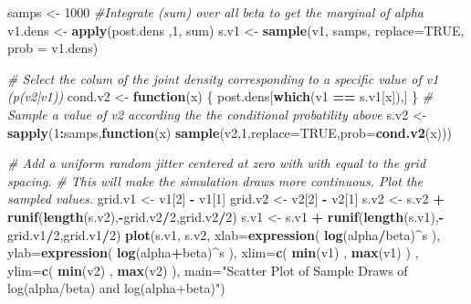 \documentclass[]{article}
\newenvironment{Shaded}{\begin{snugshade}}{\end{snugshade}}
\newcommand{\KeywordTok}[1]{\textcolor[rgb]{0.13,0.29,0.53}{\textbf{#1}}}
\newcommand{\DataTypeTok}[1]{\textcolor[rgb]{0.13,0.29,0.53}{#1}}
\newcommand{\DecValTok}[1]{\textcolor[rgb]{0.00,0.00,0.81}{#1}}
\newcommand{\StringTok}[1]{\textcolor[rgb]{0.31,0.60,0.02}{#1}}
\newcommand{\CommentTok}[1]{\textcolor[rgb]{0.56,0.35,0.01}{\textit{#1}}}
\newcommand{\OtherTok}[1]{\textcolor[rgb]{0.56,0.35,0.01}{#1}}
\newcommand{\ControlFlowTok}[1]{\textcolor[rgb]{0.13,0.29,0.53}{\textbf{#1}}}
\newcommand{\OperatorTok}[1]{\textcolor[rgb]{0.81,0.36,0.00}{\textbf{#1}}}
\newcommand{\NormalTok}[1]{#1}
\begin{document}
\begin{Shaded}
\begin{Highlighting}[]
\NormalTok{samps           <-}\StringTok{  }\DecValTok{1000}
\CommentTok{#Integrate (sum) over all beta to get the marginal of alpha}
\NormalTok{v1.dens         <-}\StringTok{  }\KeywordTok{apply}\NormalTok{(post.dens ,}\DecValTok{1}\NormalTok{, sum)}
\NormalTok{s.v1            <-}\StringTok{  }\KeywordTok{sample}\NormalTok{(v1, samps, }\DataTypeTok{replace=}\OtherTok{TRUE}\NormalTok{, }\DataTypeTok{prob =}\NormalTok{ v1.dens)}

\CommentTok{# Select the colum of the joint density corresponding to a specific value of v1 (p(v2|v1))}
\NormalTok{cond.v2         <-}\StringTok{  }\ControlFlowTok{function}\NormalTok{(x) }
\NormalTok{\{}
\NormalTok{  post.dens[}\KeywordTok{which}\NormalTok{(v1 }\OperatorTok{==}\StringTok{ }\NormalTok{s.v1[x]),]}
\NormalTok{\}}
\CommentTok{# Sample a value of v2 according the the conditional probatility above}
\NormalTok{s.v2            <-}\StringTok{  }\KeywordTok{sapply}\NormalTok{(}\DecValTok{1}\OperatorTok{:}\NormalTok{samps,}\ControlFlowTok{function}\NormalTok{(x) }\KeywordTok{sample}\NormalTok{(v2,}\DecValTok{1}\NormalTok{,}\DataTypeTok{replace=}\OtherTok{TRUE}\NormalTok{,}\DataTypeTok{prob=}\KeywordTok{cond.v2}\NormalTok{(x)))}

\CommentTok{# Add a uniform random jitter centered at zero with with equal to the grid spacing. }
\CommentTok{# This will make the simulation draws more continuous. Plot the sampled values.  }
\NormalTok{grid.v1         <-}\StringTok{  }\NormalTok{v1[}\DecValTok{2}\NormalTok{] }\OperatorTok{-}\StringTok{ }\NormalTok{v1[}\DecValTok{1}\NormalTok{]}
\NormalTok{grid.v2         <-}\StringTok{  }\NormalTok{v2[}\DecValTok{2}\NormalTok{] }\OperatorTok{-}\StringTok{ }\NormalTok{v2[}\DecValTok{1}\NormalTok{]}
\NormalTok{s.v2            <-}\StringTok{  }\NormalTok{s.v2 }\OperatorTok{+}\StringTok{ }\KeywordTok{runif}\NormalTok{(}\KeywordTok{length}\NormalTok{(s.v2),}\OperatorTok{-}\NormalTok{grid.v2}\OperatorTok{/}\DecValTok{2}\NormalTok{,grid.v2}\OperatorTok{/}\DecValTok{2}\NormalTok{)}
\NormalTok{s.v1            <-}\StringTok{  }\NormalTok{s.v1 }\OperatorTok{+}\StringTok{ }\KeywordTok{runif}\NormalTok{(}\KeywordTok{length}\NormalTok{(s.v1),}\OperatorTok{-}\NormalTok{grid.v1}\OperatorTok{/}\DecValTok{2}\NormalTok{,grid.v1}\OperatorTok{/}\DecValTok{2}\NormalTok{)}
\KeywordTok{plot}\NormalTok{(s.v1, s.v2, }
     \DataTypeTok{xlab=}\KeywordTok{expression}\NormalTok{( }\KeywordTok{log}\NormalTok{(alpha}\OperatorTok{/}\NormalTok{beta)}\OperatorTok{^}\NormalTok{s ), }
     \DataTypeTok{ylab=}\KeywordTok{expression}\NormalTok{( }\KeywordTok{log}\NormalTok{(alpha}\OperatorTok{+}\NormalTok{beta)}\OperatorTok{^}\NormalTok{s ), }
     \DataTypeTok{xlim=}\KeywordTok{c}\NormalTok{( }\KeywordTok{min}\NormalTok{(v1) , }\KeywordTok{max}\NormalTok{(v1) ) , }
     \DataTypeTok{ylim=}\KeywordTok{c}\NormalTok{( }\KeywordTok{min}\NormalTok{(v2) , }\KeywordTok{max}\NormalTok{(v2) ), }
     \DataTypeTok{main=}\StringTok{"Scatter Plot of Sample Draws of log(alpha/beta) and log(alpha+beta)"}\NormalTok{)}
\end{Highlighting}
\end{Shaded}
\end{document}
